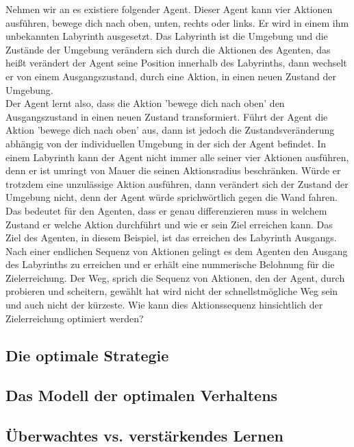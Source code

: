 Nehmen wir an es existiere folgender Agent. Dieser Agent kann vier Aktionen ausführen, bewege dich nach oben, unten, rechts oder links. Er wird in einem ihm unbekannten Labyrinth ausgesetzt. Das Labyrinth ist die Umgebung und die Zustände der Umgebung verändern sich durch die Aktionen des Agenten, das heißt verändert der Agent seine Position innerhalb des Labyrinths, dann wechselt er von einem Ausgangszustand, durch eine Aktion, in einen neuen Zustand der Umgebung. \\

Der Agent lernt also, dass die Aktion 'bewege dich nach oben' den Ausgangszustand in einen neuen Zustand transformiert. Führt der Agent die Aktion 'bewege dich nach oben' aus, dann ist jedoch die Zustandsveränderung abhängig von der individuellen Umgebung in der sich der Agent befindet. In einem Labyrinth kann der Agent nicht immer alle seiner vier Aktionen ausführen, denn er ist umringt von Mauer die seinen Aktionsradius beschränken. Würde er trotzdem eine unzulässige Aktion ausführen, dann verändert sich der Zustand der Umgebung nicht, denn der Agent würde sprichwörtlich gegen die Wand fahren. Das bedeutet für den Agenten, dass er genau differenzieren muss in welchem Zustand er welche Aktion durchführt und wie er sein Ziel erreichen kann. Das Ziel des Agenten, in diesem Beispiel, ist das erreichen des Labyrinth Ausgangs. \\

Nach einer endlichen Sequenz von Aktionen gelingt es dem Agenten den Ausgang des Labyrinths zu erreichen und er erhält eine nummerische Belohnung für die Zielerreichung. Der Weg, sprich die Sequenz von Aktionen, den der Agent, durch probieren und scheitern, gewählt hat wird nicht der schnellstmögliche Weg sein und auch nicht der kürzeste. Wie kann dies Aktionssequenz hinsichtlich der Zielerreichung optimiert werden? \\

\subsection{Die optimale Strategie}

\subsection{Das Modell der optimalen Verhaltens}


\subsection{Überwachtes \acs{vs.} verstärkendes Lernen}

